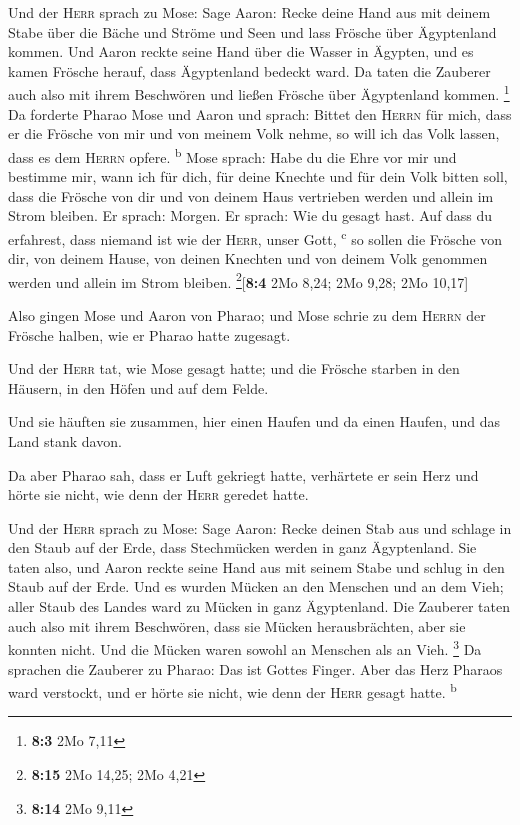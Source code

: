  Und der \textsc{Herr} sprach zu Mose: Sage Aaron: Recke
deine Hand aus mit deinem Stabe über die Bäche und Ströme und Seen und
lass Frösche über Ägyptenland kommen.  Und Aaron reckte
seine Hand über die Wasser in Ägypten, und es kamen Frösche herauf, dass
Ägyptenland bedeckt ward.  Da taten die Zauberer auch also
mit ihrem Beschwören und ließen Frösche über Ägyptenland kommen.
\footnote{\textbf{8:3} 2Mo 7,11}  Da forderte Pharao Mose
und Aaron und sprach: Bittet den \textsc{Herrn} für mich, dass er die
Frösche von mir und von meinem Volk nehme, so will ich das Volk lassen,
dass es dem \textsc{Herrn} opfere. \textsuperscript{b} 
Mose sprach: Habe du die Ehre vor mir und bestimme mir, wann ich für
dich, für deine Knechte und für dein Volk bitten soll, dass die Frösche
von dir und von deinem Haus vertrieben werden und allein im Strom
bleiben.  Er sprach: Morgen. Er sprach: Wie du gesagt
hast. Auf dass du erfahrest, dass niemand ist wie der \textsc{Herr},
unser Gott, \textsuperscript{c}  so sollen die Frösche von
dir, von deinem Hause, von deinen Knechten und von deinem Volk genommen
werden und allein im Strom bleiben. \footnote{\textbf{8:15} 2Mo 14,25;
  2Mo 4,21}{[}\textbf{8:4} 2Mo 8,24; 2Mo 9,28; 2Mo 10,17{]}

 Also gingen Mose und Aaron von Pharao; und Mose schrie zu
dem \textsc{Herrn} der Frösche halben, wie er Pharao hatte zugesagt.

 Und der \textsc{Herr} tat, wie Mose gesagt hatte; und die
Frösche starben in den Häusern, in den Höfen und auf dem Felde.

 Und sie häuften sie zusammen, hier einen Haufen und da
einen Haufen, und das Land stank davon.

 Da aber Pharao sah, dass er Luft gekriegt hatte,
verhärtete er sein Herz und hörte sie nicht, wie denn der \textsc{Herr}
geredet hatte.

 Und der \textsc{Herr} sprach zu Mose: Sage Aaron: Recke
deinen Stab aus und schlage in den Staub auf der Erde, dass Stechmücken
werden in ganz Ägyptenland.  Sie taten also, und Aaron
reckte seine Hand aus mit seinem Stabe und schlug in den Staub auf der
Erde. Und es wurden Mücken an den Menschen und an dem Vieh; aller Staub
des Landes ward zu Mücken in ganz Ägyptenland.  Die
Zauberer taten auch also mit ihrem Beschwören, dass sie Mücken
herausbrächten, aber sie konnten nicht. Und die Mücken waren sowohl an
Menschen als an Vieh. \footnote{\textbf{8:14} 2Mo 9,11} 
Da sprachen die Zauberer zu Pharao: Das ist Gottes Finger. Aber das Herz
Pharaos ward verstockt, und er hörte sie nicht, wie denn der
\textsc{Herr} gesagt hatte. \textsuperscript{b}

